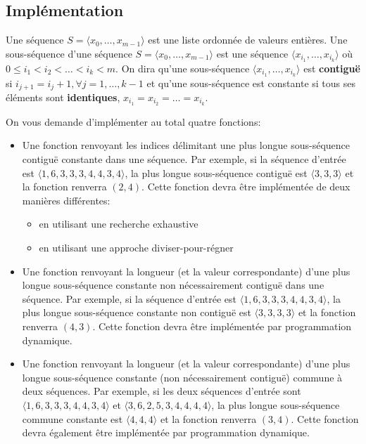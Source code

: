 \documentclass[a4paper,10pt]{article}
\begin{document}
\subsection*{Implémentation}

Une séquence $S=\langle x_0,\ldots,x_{m-1}\rangle$ est une liste
ordonnée de valeurs entières. Une sous-séquence d'une séquence
$S=\langle x_0,\ldots,x_{m-1}\rangle$ est une séquence $\langle
x_{i_1},\ldots,x_{i_k}\rangle$ où $0\leq i_1<i_2<\ldots<i_k<m$. On
dira qu'une sous-séquence $\langle x_{i_1},\ldots,x_{i_k}\rangle$ est
{\bf contiguë} si $i_{j+1}=i_{j}+1, \forall j=1,\ldots,k-1$ et qu'une
sous-séquence est constante si tous ses éléments sont {\bf identiques},
$x_{i_1}=x_{i_2}=\ldots=x_{i_k}$.

On vous demande d'implémenter au total quatre fonctions:
\begin{itemize}
\item Une fonction renvoyant les indices délimitant une plus longue
  sous-séquence contiguë constante dans une séquence. Par exemple, si
  la séquence d'entrée est $\langle 1,6,3,3,3,4,4,3,4\rangle$, la plus
  longue sous-séquence contiguë est $\langle 3,3,3\rangle$ et la
  fonction renverra $(2,4)$. Cette fonction devra être implémentée de
  deux manières différentes:
\begin{itemize}
\item en utilisant une recherche exhaustive
\item en utilisant une approche diviser-pour-régner
\end{itemize}
\item Une fonction renvoyant la longueur (et la valeur correspondante)
  d'une plus longue sous-séquence constante non nécessairement
  contiguë dans une séquence. Par exemple, si la séquence d'entrée est
  $\langle 1,6,3,3,3,4,4,3,4\rangle$, la plus longue sous-séquence
  constante non contiguë est $\langle 3,3,3,3\rangle$ et la fonction
  renverra $(4,3)$. Cette fonction devra être implémentée par
 programmation dynamique.
\item Une fonction renvoyant la longueur (et la valeur correspondante)
  d'une plus longue sous-séquence constante (non nécessairement
  contiguë) commune à deux séquences. Par exemple, si les deux
  séquences d'entrée sont $\langle 1,6,3,3,3,4,4,3,4\rangle$ et
  $\langle 3,6,2,5,3,4,4,4,4\rangle$, la plus longue sous-séquence
  commune constante est $\langle 4,4,4 \rangle$ et la fonction
  renverra $(3,4)$. Cette fonction devra également être implémentée
  par programmation dynamique.
\end{itemize}
\end{document}
